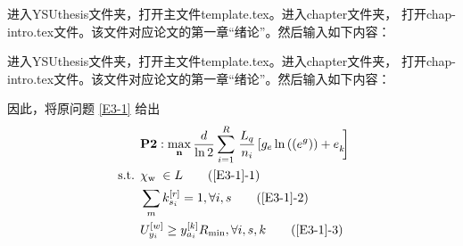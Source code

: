进入YSUthesis文件夹，打开主文件template.tex。进入chapter文件夹，
打开chap-intro.tex文件。该文件对应论文的第一章“绪论”。然后输入如下内容：

进入YSUthesis文件夹，打开主文件template.tex。进入chapter文件夹，
打开chap-intro.tex文件。该文件对应论文的第一章“绪论”。然后输入如下内容：

因此，将原问题 \eqref{E3-1} 给出
\begin{align}
&\textbf{P2}:\max\limits_{\mathbf{n}}\frac{d}{\ln{2}}\sum_{i=1}^{R}\left.\frac{L_{q}}{n_{i}}\left[{g_e\ln{\left(\left(e^{g}\right)\right)}+e}_k\!\!\right.\right]      \label{E3-1}\\
\text { s.t. }
& \chi_{\text {w }} \in L                                                                                                                    \tag{\ref{E3-1}{-1}}      \label{E3-1-1}\\  %
& \sum_m k_{s_i}^{[r]}=1, \forall i, s                                                                                                       \tag{\ref{E3-1}{-2}}      \label{E3-1-2}\\  %
& U_{y_i}^{[w]} \geq y_{a_i}^{[k]} R_{\min }, \forall i, s, k                                                                                \tag{\ref{E3-1}{-3}}      \label{E3-1-3}   %
\end{align}

